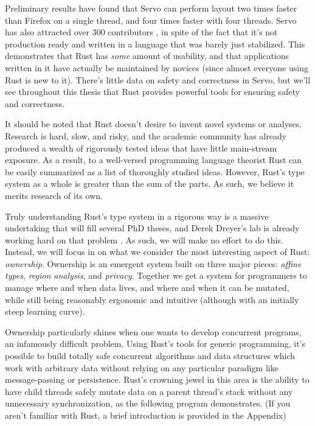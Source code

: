 Preliminary results \cite{servo-exp} have found that Servo can
perform layout two times faster than Firefox on a single thread, and four times
faster with four threads. Servo has also attracted over 300 contributors
\cite{servo-gh}, in spite of the fact that it's not production ready and
written in a language that was barely just stabilized. This demonstrates that
Rust has \emph{some} amount of usability, and that applications written in it
have actually be maintained by novices (since almost everyone using Rust
is new to it). There's little data on safety and correctness in Servo, but we'll
see throughout this thesis that Rust provides powerful tools for ensuring
safety and correctness.

It should be noted that Rust doesn't desire to invent novel systems or analyses.
Research is hard, slow, and risky, and the academic community has already produced
a wealth of rigorously tested ideas that have little main-stream exposure. As a
result, to a well-versed programming language theorist Rust can be easily
summarized as a list of thoroughly studied ideas. However, Rust's type system
as a whole is greater than the sum of the parts. As such, we believe it merits
research of its own.

Truly understanding Rust's type system in a rigorous way is a massive
undertaking that will fill several PhD theses, and Derek Dreyer's lab is already
working hard on that problem \cite{rustbelt}. As such, we will make no effort
to do this. Instead, we will focus in on what we consider the most interesting
aspect of Rust: \emph{ownership}. Ownership is an emergent system built on three
major pieces: \emph{affine types}, \emph{region analysis}, and \emph{privacy}. Together we get
a system for programmers to manage where and when data lives, and where
and when it can be mutated, while still being reasonably ergonomic and intuitive
(although with an initially steep learning curve).

Ownership particularly shines when one wants to develop concurrent programs,
an infamously difficult problem. Using Rust's tools for generic programming,
it's possible to build totally safe concurrent algorithms and data structures
which work with arbitrary data without relying on any particular paradigm like
message-passing or persistence. Rust's crowning jewel in this area is the
ability to have child threads safely mutate data on a parent thread's stack
without any unnecessary synchronization, as the following program demonstrates.
(If you aren't familiar with Rust, a brief introduction is provided in the Appendix)

